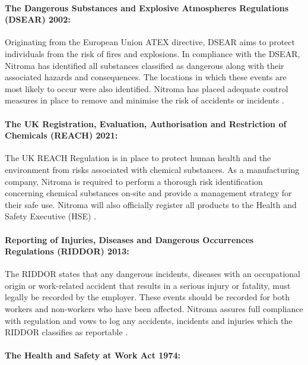 \paragraph{The Dangerous Substances and Explosive Atmospheres Regulations (DSEAR) 2002:}

Originating from the European Union ATEX directive, DSEAR  aims to protect individuals from the risk of fires and explosions. In compliance with the DSEAR, Nitroma has identified all substances classified as dangerous along with their associated hazards and consequences. The locations in which these events are most likely to occur were also identified. Nitroma has placed adequate control measures in place to remove and minimise the risk of accidents or incidents \cite{health_and_safety_executive_dangerous_nodate}. 

\paragraph{The UK Registration, Evaluation, Authorisation and Restriction of Chemicals (REACH) 2021:}

The UK REACH Regulation is in place to protect human health and the environment from risks associated with chemical substances. As a manufacturing company, Nitroma is required to perform a thorough risk identification concerning chemical substances on-site and provide a management strategy for their safe use. Nitroma will also officially register all products to the Health and Safety Executive (HSE) \cite{health_and_safety_executive_uk_nodate}. 

\paragraph{Reporting of Injuries, Diseases and Dangerous Occurrences Regulations (RIDDOR) 2013:}

The RIDDOR states that any dangerous incidents, diseases with an occupational origin or work-related accident that results in a serious injury or fatality, must legally be recorded by the employer. These events should be recorded for both workers and non-workers who have been affected. Nitroma assures full compliance with regulation and vows to log any accidents, incidents and injuries which the RIDDOR classifies as reportable \cite{health_and_safety_executive_reporting_2013}.

\paragraph{The Health and Safety at Work Act 1974:}

